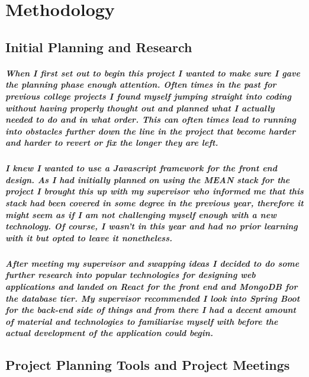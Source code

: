\chapter{Methodology}
\section{Initial Planning and Research}
\paragraph{When I first set out to begin this project I wanted to make sure I gave the planning phase enough attention. Often times in the past for previous college projects I found myself jumping straight into coding without having properly thought out and planned what I actually needed to do and in what order. This can often times lead to running into obstacles further down the line in the project that become harder and harder to revert or fix the longer they are left.}
\paragraph{I knew I wanted to use a Javascript framework for the front end design. As I had initially planned on using the MEAN stack for the project I brought this up with my supervisor who informed me that this stack had been covered in some degree in the previous year, therefore it might seem as if I am not challenging myself enough with a new technology. Of course, I wasn't in this year and had no prior learning with it but opted to leave it nonetheless.}
\paragraph{After meeting my supervisor and swapping ideas I decided to do some further research into popular technologies for designing web applications and landed on React for the front end and MongoDB for the database tier. My supervisor recommended I look into Spring Boot for the back-end side of things and from there I had a decent amount of material and technologies to familiarise myself with before the actual development of the application could begin.}

\section{Project Planning Tools and Project  Meetings}

